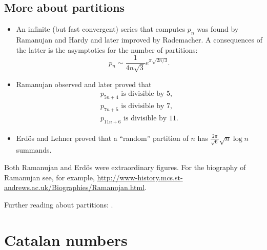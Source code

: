 \begin{page}
\setcounter{section}{4}
\setcounter{subsection}{0}
\setcounter{dfn}{22}
\label{portion:854}

\subsection{More about partitions}
\begin{itemize}
\item 
An infinite (but fast convergent) series that computes $p_n$ was found by Ramanujan and Hardy and later improved by Rademacher.
A consequences of the latter is the asymptotics for the number of partitions:
\[
p_n \sim \frac{1}{4n\sqrt{3}} e^{\pi\sqrt{2n/3}}.
\]
\item
Ramanujan observed and later proved that
\begin{gather*}
p_{5n+4} \text{ is divisible by } 5,\\
p_{7n+5} \text{ is divisible by } 7,\\
p_{11n+6} \text{ is divisible by } 11.
\end{gather*}
\item
Erd\"os and Lehner proved that a ``random'' partition of $n$ has $\frac{2\pi}{\sqrt{6}} \sqrt{n} \log n$ summands.
\end{itemize}

Both Ramanujan and Erd\"os were extraordinary figures.
For the biography of Ramanujan see, for example,
\url{http://www-history.mcs.st-andrews.ac.uk/Biographies/Ramanujan.html}.

Further reading about partitions: \cite{AE04}.


\newpage


\end{page}

\begin{page}
\setcounter{section}{4}
\setcounter{subsection}{1}
\setcounter{dfn}{0}
\label{portion:855}

\section{Catalan numbers}

\end{page}

